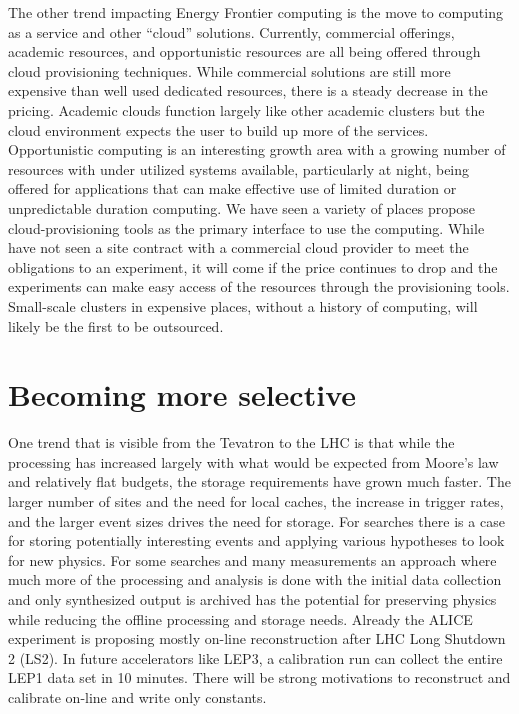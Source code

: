 The other trend impacting Energy Frontier computing is the move to
computing as a service and other ``cloud'' solutions.  Currently,
commercial offerings, academic resources, and opportunistic resources
are all being offered through cloud provisioning techniques.  While
commercial solutions are still more expensive than well used dedicated
resources, there is a steady decrease in the pricing.  Academic clouds
function largely like other academic clusters but the cloud
environment expects the user to build up more of the services.
Opportunistic computing is an interesting growth area with a growing
number of resources with under utilized systems available,
particularly at night, being offered for applications that can make
effective use of limited duration or unpredictable duration computing.
We have seen a variety of places propose cloud-provisioning tools as
the primary interface to use the computing. While have not seen a site
contract with a commercial cloud provider to meet the obligations to
an experiment, it will come if the price continues to drop and the
experiments can make easy access of the resources through the
provisioning tools.  Small-scale clusters in expensive places, without
a history of computing, will likely be the first to be outsourced.

\section{Becoming more selective}
\label{sec:comp-select}

One trend that is visible from the Tevatron to the LHC is that while
the processing has increased largely with what would be expected from
Moore's law and relatively flat budgets, the storage requirements have
grown much faster.  The larger number of sites and the need for local
caches, the increase in trigger rates, and the larger event sizes
drives the need for storage.  For searches there is a case for storing
potentially interesting events and applying various hypotheses to look
for new physics.  For some searches and many measurements an approach
where much more of the processing and analysis is done with the
initial data collection and only synthesized output is archived has
the potential for preserving physics while reducing the offline
processing and storage needs.  Already the ALICE experiment is
proposing mostly on-line reconstruction after LHC Long Shutdown 2
(LS2).  In future accelerators like LEP3, a calibration run can
collect the entire LEP1 data set in 10 minutes.  There will be strong
motivations to reconstruct and calibrate on-line and write only
constants.

